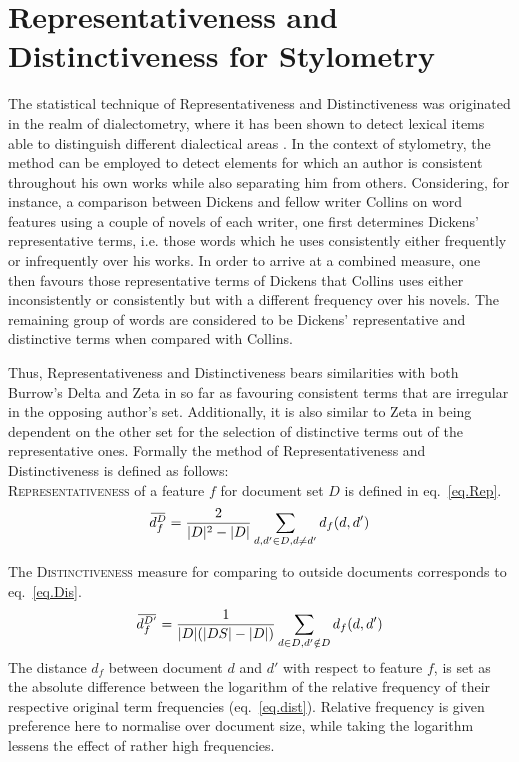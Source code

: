 \documentclass[a4paper,10pt,twoside,fleqn]{article}
\newcommand{\overbar}[1]{\mkern 2.0mu\overline{\mkern-2.0mu#1\mkern-2.0mu}\mkern 2.0mu}
\begin{document}
\section{Representativeness and Distinctiveness for Stylometry} \label{sec:method}
The statistical technique of Representativeness and Distinctiveness was 
originated in the realm of dialectometry, where it has been
shown to detect lexical items able to distinguish different dialectical 
areas \cite{prokic2012detecting}.
In the context of stylometry, the method can be employed to detect elements for 
which an author is consistent throughout his own works while also separating him 
from others. 
Considering, for instance, a comparison between Dickens and fellow 
writer Collins on word features using a couple of novels of each writer, 
one first determines Dickens' representative terms, i.e. those words which he
uses consistently either frequently or infrequently over his works. 
In order to arrive at a combined measure, one then favours those representative 
terms of Dickens that Collins uses either inconsistently or consistently but with a
different frequency over his novels. The remaining group of words are considered 
to be Dickens' representative and distinctive terms when compared with Collins. 

Thus, Representativeness and Distinctiveness bears similarities with both 
Burrow's Delta \cite{Burrows2002delta} and Zeta  \cite{Burrows2007all} in so 
far as favouring consistent terms that are irregular in the opposing author's set. 
Additionally, it is also similar to Zeta in being dependent on the other set 
for the selection of distinctive terms out of the representative ones. 
Formally the method of Representativeness and Distinctiveness is defined 
as follows: \\

\textsc{Representativeness} of a feature $f$ for document set $D$ is defined 
in eq.~\ref{eq.Rep}. \\


 \begin{equation}\label{eq.Rep}
 \overbar{d_f^{D}} = \frac{2}{|D|^2 -|D|} \sum\limits_{d,d' \in D,d \neq d'} d_f(d,d')
 \end{equation}
 
The \textsc{Distinctiveness} measure for comparing to outside documents corresponds 
to eq.~\ref{eq.Dis}.\\


\begin{equation}\label{eq.Dis}
 \overbar{d_f^{D'}} = \frac{1}{|D|(|DS| -|D|)} \sum\limits_{d \in D, d'\notin D} d_f(d,d')
\end{equation}
The distance $d_f$ between document $d$ and $d'$ with respect to feature $f$, is set as the 
absolute difference between the logarithm of the relative frequency of their respective
original term frequencies (eq.~\ref{eq.dist}).
Relative frequency is given preference here to normalise over document size, while 
taking the logarithm lessens the effect of rather high frequencies.
\end{document}
